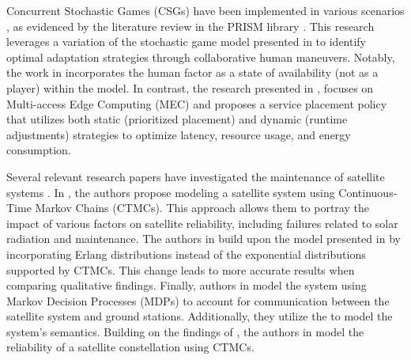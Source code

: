 Concurrent Stochastic Games (CSGs) \cite{Kwiatkowska2020,Kwiatkowska2021,KNPS19,KNPS22} have been implemented in various scenarios \cite{BAOUYA2024101161}, as evidenced by the literature review in the PRISM library  \cite{prismusecase}. This research leverages a variation of the stochastic game model presented in \cite{Javier2015,Javier201152} to identify optimal adaptation strategies through collaborative human maneuvers. Notably, the work in \cite{Javier201152} incorporates the human factor as a state of availability (not as a player) within the model.  In contrast, the research presented in \cite{Ray2023,RayBanerjee2023}, focuses on Multi-access Edge Computing (MEC) and proposes a service placement policy that utilizes both static (prioritized placement) and dynamic (runtime adjustments) strategies to optimize latency, resource usage, and energy consumption.


Several relevant research papers have investigated the maintenance of satellite systems \cite{Hoque2015,Yu2015, Zhaoguang2013}. In \cite{Zhaoguang2013}, the authors propose modeling a satellite system using Continuous-Time Markov Chains (CTMCs). This approach allows them to portray the impact of various factors on satellite reliability, including failures related to solar radiation and maintenance. The authors in \cite{Hoque2015}  build upon the model presented in \cite{Zhaoguang2013} by incorporating Erlang distributions instead of the exponential distributions supported by CTMCs. This change leads to more accurate results when comparing qualitative findings. Finally, authors in \cite{Yu2015} model the system using Markov Decision Processes (MDPs) to account for communication between the satellite system and ground stations. Additionally, they utilize the  to model the system's semantics. Building on the findings of \cite{Zhaoguang2013}, the authors in \cite{Zhaoguang2016} model the reliability of a satellite constellation using CTMCs. 